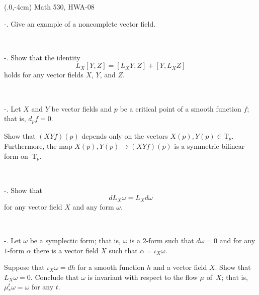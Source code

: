 \documentclass[a4paper,10pt]{article}
\def\T{\mathrm{T}}%
\begin{document}
\pagestyle{empty}
\begin{textblock*}{150mm}(.0\textwidth,-4cm)
\hfill
Math 530, HWA-08
\end{textblock*}

-. Give an example of a noncomplete vector field.

\ 

-. Show that the identity
\[L_X[Y,Z]=[L_XY,Z]+[Y,L_XZ]\]
holds for any vector fields $X$, $Y$, and $Z$.

\ 

-. Let $X$ and $Y$ be vector
fields and
$p$ be a critical point of a smooth function $f$;
that is, $d_pf=0$.

Show that $(XYf)(p)$ depends only on the vectors $X(p), Y (p)\in \T_p$. Furthermore,
the map $X(p), Y (p) \to  (XY f)(p)$ is a symmetric bilinear form on~$\T_p$.

\ 

-. Show that 
\[dL_X\omega=L_Xd\omega\]
for any vector field $X$ and any form $\omega$.

\ 

-. Let $\omega$ be a symplectic form; that is, $\omega$ is a 2-form such that $d\omega=0$ and for any $1$-form $\alpha$ there is a vector field $X$ such that $\alpha=\iota_X\omega$.

Suppose that $\iota_X\omega=dh$ for a smooth function $h$ and a vector field $X$.
Show that $L_X\omega=0$.
Conclude that $\omega$ is invariant with respect to the flow $\mu$ of~$X$; that is, $\mu^t_*\omega=\omega$ for any $t$.
\end{document}
